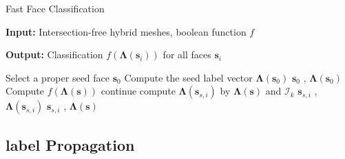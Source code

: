 




\begin{algorithm}[ht]
\caption{Fast Face Classification}
\label{code:floodfill}
\textbf{Input: } Intersection-free hybrid meshes, boolean function $f$

\textbf{Output: } Classification $f(\bm{\Lambda}(\bm{s}_i))$ for all faces $\bm{s}_i$


\begin{algorithmic}[1]
\State Select a proper seed face $\bm{s}_0$
\State Compute the seed label vector $\boldsymbol{\Lambda}(\bm{s}_0)$
\State {} { $\bm{s}_0$ , $\boldsymbol{\Lambda}(\bm{s}_0)$}
\State
{}
    \State Compute $f(\boldsymbol{\Lambda}(\bm{s}))$
            \State continue
        \EndIf
            \State compute $\boldsymbol{\Lambda}(\bm{s}_{s, i})$ by $\boldsymbol{\Lambda}(\bm{s})$ and ${\bm{\mathcal{I}}}_k$
            \State {} { $\bm{s}_{s, i}$ , $\boldsymbol{\Lambda}(\bm{s}_{s, i})$}
        \Else
            \State {} { $\bm{s}_{s, i}$ , $\boldsymbol{\Lambda}(\bm{s})$}
        \EndIf
    \EndFor
\EndFunction
\end{algorithmic}
\end{algorithm}


\subsection{label Propagation}
\label{sec:propagation}


